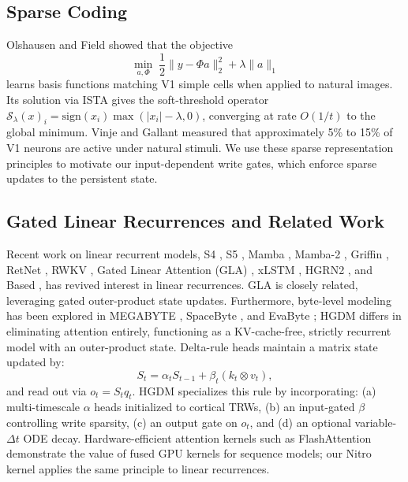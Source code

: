 \documentclass{article}
\newcommand{\Sc}{\mathcal{S}}
\begin{document}
\subsection{Sparse Coding}

Olshausen and Field \cite{olshausen1996sparse} showed that the objective
\begin{equation}\label{eq:sparse}
  \min_{a,\Phi}\;\frac{1}{2}\|y - \Phi a\|_2^2 + \lambda\|a\|_1
\end{equation}
learns basis functions matching V1 simple cells when applied to natural images.
Its solution via ISTA \cite{beck2009ista} gives the soft-threshold operator
$\Sc_\lambda(x)_i = \mathrm{sign}(x_i)\max(|x_i|-\lambda,0)$, converging at
rate $O(1/t)$ to the global minimum. Vinje and Gallant
\cite{vinje2000sparse} measured that approximately 5\% to 15\% of V1 neurons are active
under natural stimuli. We use these sparse representation principles to motivate our input-dependent write gates, which enforce sparse updates to the persistent state.

\subsection{Gated Linear Recurrences and Related Work}

Recent work on linear recurrent models, S4 \cite{gu2022s4}, S5 \cite{smith2023s5}, Mamba
\cite{gu2023mamba}, Mamba-2 \cite{dao2024mamba2}, Griffin \cite{de2024griffin},
RetNet \cite{sun2023retnet}, RWKV \cite{peng2023rwkv}, Gated Linear Attention (GLA)
\cite{yang2023gla}, xLSTM \cite{beck2024xlstm}, HGRN2 \cite{qin2024hgrn2}, and
Based \cite{arora2024based}, has revived interest in linear recurrences. GLA is
closely related, leveraging gated outer-product state updates. Furthermore,
byte-level modeling has been explored in MEGABYTE \cite{yu2023megabyte},
SpaceByte \cite{spacebyte2024}, and EvaByte \cite{evabyte2025};
HGDM differs in eliminating attention entirely, functioning as a KV-cache-free, strictly recurrent model with an outer-product state.
Delta-rule heads \cite{schlag2021linear} maintain a matrix state updated by:
\begin{equation}
  S_t = \alpha_t S_{t-1} + \beta_t (k_t \otimes v_t),
  \label{eq:delta}
\end{equation}
and read out via $o_t = S_t q_t$. HGDM specializes this rule by incorporating: (a)
multi-timescale $\alpha$ heads initialized to cortical TRWs, (b) an input-gated
$\beta$ controlling write sparsity, (c) an output gate on $o_t$, and (d) an
optional variable-$\Delta t$ ODE decay. Hardware-efficient attention kernels
such as FlashAttention \cite{dao2022flashattention,dao2023flashattention2}
demonstrate the value of fused GPU kernels for sequence models; our Nitro
kernel applies the same principle to linear recurrences.
\end{document}
